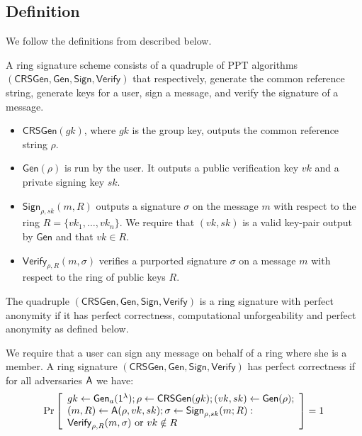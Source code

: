 \subsection{Definition}
We follow the definitions from \cite{ICALP:ChaGroSah07} described below.

\begin{definition}
A ring signature scheme consists of a quadruple of
PPT algorithms $(\mathsf{CRSGen}, \mathsf{Gen}, \mathsf{Sign}, \mathsf{Verify})$ that respectively, generate the common
reference string, generate keys for a user, sign a message, and verify the signature of a
message.
\begin{itemize}
\item $\mathsf{CRSGen}(gk)$, where $gk$ is the group key, outputs the common reference
string $\rho$.
\item $\mathsf{Gen}(\rho)$ is run by the user. It outputs a public verification key $vk$ and a private
signing key $sk$.
\item $\mathsf{Sign}_{\rho,sk}(m, R)$ outputs a signature $\sigma$ on the message $m$ with respect to the ring
$R = \{vk_1,\ldots,vk_n\}$. We require that $(vk, sk)$ is a valid key-pair output by $\mathsf{Gen}$
and that $vk \in R$.
\item $\mathsf{Verify}_{\rho,R}(m, \sigma)$ verifies a purported signature $\sigma$ on a message $m$ with respect to
the ring of public keys $R$.
\end{itemize}
The quadruple $(\mathsf{CRSGen}, \mathsf{Gen}, \mathsf{Sign}, \mathsf{Verify})$ is a ring signature with perfect
anonymity if it has perfect correctness, computational unforgeability and perfect
anonymity as defined below.
\end{definition}

\begin{definition}
We require that a user can sign any message on behalf of a ring where she is a member. A ring signature $(\mathsf{CRSGen}, \mathsf{Gen}, \mathsf{Sign}, \mathsf{Verify})$
has perfect correctness if for all adversaries $\mathsf{A}$ we have:
$$
\Pr\left[\begin{array}{l}
gk\gets\mathsf{Gen}_a(1^\lambda);\rho\gets\mathsf{CRSGen}(gk);(vk,sk)\gets\mathsf{Gen}(\rho);\\
(m,R)\gets\mathsf{A}(\rho,vk,sk);\sigma\gets\mathsf{Sign}_{\rho,sk}(m;R):\\
\mathsf{Verify}_{\rho,R}(m,\sigma)\text{ or }vk\notin R
\end{array}\right]=1
$$
\end{definition}

